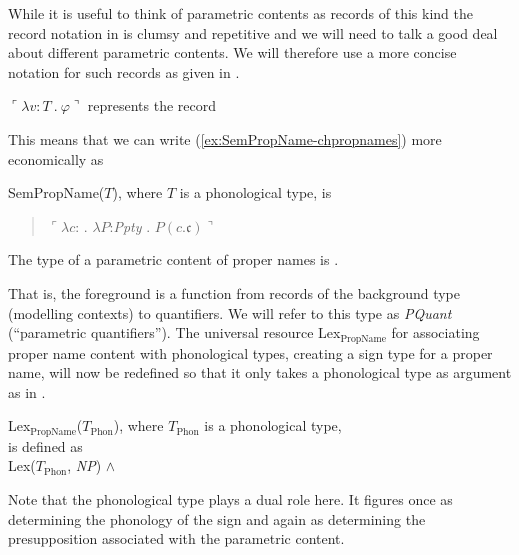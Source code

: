 While it is useful to think of parametric contents as records of this
kind the record notation in \preveg{} is clumsy and repetitive and we
will need to talk a good deal about different parametric contents.  We
will therefore use a more concise notation for such records as given
in \nexteg{}.
\begin{ex} 
  $\ulcorner\lambda v\!:\!T\ .\ \varphi\urcorner$ represents the record
  \begin{quote}
  \end{quote}
\label{ex:cornerquote-notation} 
\end{ex}
This means that we can write (\ref{ex:SemPropName-chpropnames}) more
economically as \nexteg{}
\begin{ex} 
SemPropName($T$), where $T$ is a phonological type,
is
\begin{quote}
  $\ulcorner\lambda c$:  . $\lambda
                       P$:\textit{Ppty} . $P(c.\mathfrak{c})\urcorner$
                     \end{quote}
                     
\label{ex:SemPropName-chpropnames-econ} 
\end{ex}
  


The type of a parametric content of proper names is \nexteg{}.
\begin{ex}
\end{ex}
That is, the foreground is a function from
records of the  background type (modelling contexts) to quantifiers.  We will refer to this type as
\textit{PQuant} (``parametric quantifiers'').  The universal resource
Lex$_{\mathrm{PropName}}$ for associating proper name content with
phonological types, creating a sign type for a proper name, will now be
redefined so that it only takes a phonological type as argument as in
\nexteg{}.

\begin{ex} 
Lex$_{\mathrm{PropName}}$($T_{\mathrm{Phon}}$), where
$T_{\mathrm{Phon}}$ is a phonological type,
\\
is defined as \\
Lex($T_{\mathrm{Phon}}$, \textit{NP}) \d{$\wedge$}
\end{ex} 
Note that the phonological type plays a dual role here.  It figures
once as determining the phonology of the sign and again as determining
the presupposition associated with the parametric content.   
  

